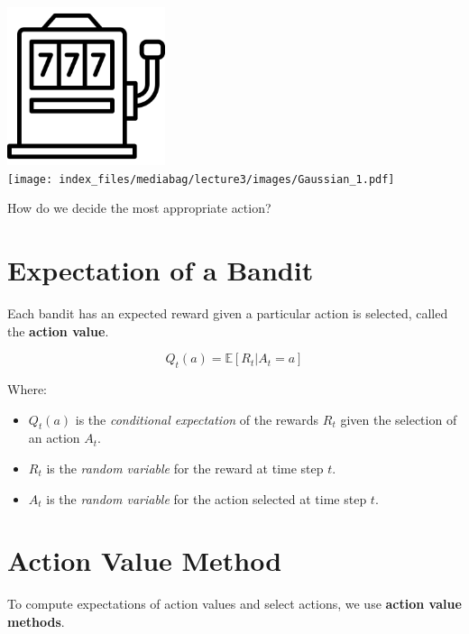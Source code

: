 \documentclass[
  letterpaper,
  DIV=11,
  numbers=noendperiod]{scrreprt}
\providecommand{\tightlist}{%
  \setlength{\itemsep}{0pt}\setlength{\parskip}{0pt}}\usepackage{longtable,booktabs,array}
\begin{document}
\includegraphics[width=1.82292in,height=1.82292in]{lecture3/images/Bandit.png}\\
\texttt{[image: index\_files/mediabag/lecture3/images/Gaussian\_1.pdf]}

\begin{tcolorbox}[enhanced jigsaw, colback=white, left=2mm, breakable, opacityback=0, bottomrule=.15mm, rightrule=.15mm, arc=.35mm, colframe=quarto-callout-note-color-frame, leftrule=.75mm, toprule=.15mm]

How do we decide the most appropriate action? 🤔

\end{tcolorbox}

\section{Expectation of a Bandit}\label{expectation-of-a-bandit}

Each bandit has an expected reward given a particular action is
selected, called the \textbf{action value}.

\[
Q_t(a) = \mathbb{E}[R_t | A_t = a]
\]

Where:

\begin{itemize}
\tightlist
\item
  \(Q_t(a)\) is the \emph{conditional expectation} of the rewards
  \(R_t\) given the selection of an action \(A_t\).
\item
  \(R_t\) is the \emph{random variable} for the reward at time step
  \(t\).
\item
  \(A_t\) is the \emph{random variable} for the action selected at time
  step \(t\).
\end{itemize}

\section{Action Value Method}\label{action-value-method}

To compute expectations of action values and select actions, we use
\textbf{action value methods}.
\end{document}
